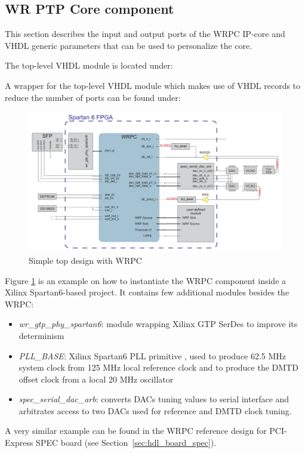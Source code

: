 \subsection{WR PTP Core component}
\label{sec:hdl_wrpc}
This section describes the input and output ports of the WRPC IP-core and VHDL generic parameters
that can be used to personalize the core.

The top-level VHDL module is located under:\\

A wrapper for the top-level VHDL module which makes use of VHDL records to reduce the number of
ports can be found under:\\

\begin{figure}
  \begin{center}
    \includegraphics[width=.9\textheight, angle=270]{fig/basic_top.pdf}
    \caption{Simple top design with WRPC}
    \label{intro:fig:wrpc_top}
  \end{center}
\end{figure}

Figure \ref{intro:fig:wrpc_top} is an example on how to instantiate the WRPC component inside a
Xilinx Spartan6-based project. It contains few additional modules besides the WRPC:
\begin{itemize}
  \item \emph{wr\_gtp\_phy\_spartan6}: module wrapping Xilinx GTP SerDes to improve its determinism
  \item \emph{PLL\_BASE}: Xilinx Spartan6 PLL primitive \cite{pll_base}, used to produce 62.5 MHz
    system clock from 125 MHz local reference clock and to produce the DMTD offset clock from a
    local 20 MHz oscillator
  \item \emph{spec\_serial\_dac\_arb}: converts DACs tuning values to serial interface and
    arbitrates access to two DACs used for reference and DMTD clock tuning.
\end{itemize}

A very similar example can be found in the WRPC reference design for PCI-Express SPEC board (see
Section~\ref{sec:hdl_board_spec}).











